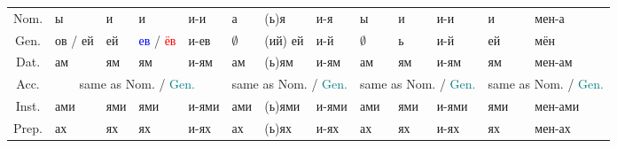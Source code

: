 \documentclass[a4paper, landscape, 11pt]{article}
\newcommand{\an}[1]{\textcolor{teal}{#1}} %
\newcommand{\us}[1]{\textcolor{blue}{#1}} %
\newcommand{\st}[1]{\textcolor{red}{#1}}  %
\begin{document}
\begin{tabularx}{\textwidth}{|c|XXXX|XXX|XXX|XX|}
	  Nom.    & ы                   & и                 & и                 & и-и          & а           & (ь)я     & и-я        & ы           & и                 & и-и        & и                     & мен-а                  \\
	  Gen.    & ов / ей             & ей                & \us{ев} / \st{ёв} & и-ев         & $\emptyset$ & (ий) ей  & и-й        & $\emptyset$ & ь                 & и-й        & ей                    & мён                    \\
	  Dat.    & ам                  & ям                & ям                & и-ям         & ам          & (ь)ям    & и-ям       & ам          & ям                & и-ям       & ям                    & мен-ам                 \\ \cline{2-13}
	  Acc.    &                    \multicolumn{4}{c|}{same as Nom. / \an{Gen.}}                     & \multicolumn{3}{c|}{same as Nom. / \an{Gen.}} &     \multicolumn{3}{c|}{same as Nom. / \an{Gen.}}      &      \multicolumn{2}{c|}{same as Nom. / \an{Gen.}}       \\ \cline{2-13}
	  Inst.    & ами                 & ями               & ями               & и-ями        & ами         & (ь)ями   & и-ями      & ами         & ями               & и-ями      & ями                   & мен-ами                \\
	  Prep.    & ах                  & ях                & ях                & и-ях         & ах          & (ь)ях    & и-ях       & ах          & ях                & и-ях       & ях                    & мен-ах                 \\ \hline
\end{tabularx}
\end{document}
